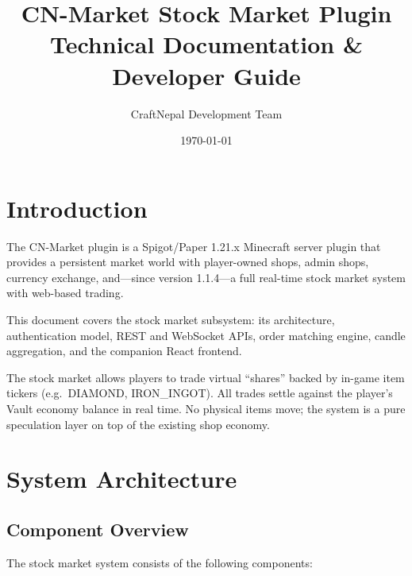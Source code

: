 \documentclass[12pt,a4paper]{report}
\title{\textbf{CN-Market Stock Market Plugin}\\[0.5em]
\large Technical Documentation \& Developer Guide}
\author{CraftNepal Development Team}
\date{\today}
\begin{document}
\maketitle
\tableofcontents
\newpage

\newcommand{\apipath}[1]{\path{#1}}

\chapter{Introduction}

The CN-Market plugin is a Spigot/Paper 1.21.x Minecraft server plugin that
provides a persistent market world with player-owned shops, admin shops,
currency exchange, and---since version 1.1.4---a full real-time stock market
system with web-based trading.

This document covers the stock market subsystem: its architecture,
authentication model, REST and WebSocket APIs, order matching engine,
candle aggregation, and the companion React frontend.

The stock market allows players to trade virtual ``shares'' backed by
in-game item tickers (e.g.\ DIAMOND, IRON\_INGOT). All trades settle
against the player's Vault economy balance in real time. No physical items
move; the system is a pure speculation layer on top of the existing shop
economy.

\chapter{System Architecture}

\section{Component Overview}

The stock market system consists of the following components:
\end{document}
